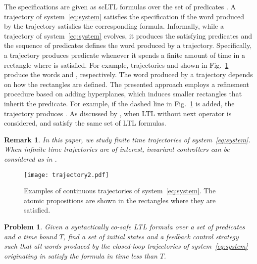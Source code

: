 \documentclass{ifacconf}
\newtheorem{remark}{Remark}
\newtheorem{problem}{Problem}
\newcommand{\TIMEBOUND}{\ensuremath{T}}
\begin{document}
The specifications are given as scLTL formulas over the set of predicates . A trajectory of system~\eqref{eq:system} satisfies the specification if the word produced by the trajectory satisfies the corresponding formula. 
Informally, while a trajectory of system~\eqref{eq:system} evolves, it produces the satisfying predicates and the sequence of predicates defines the word produced by a trajectory. Specifically, a trajectory produces predicate  whenever it spends a finite amount of time in a rectangle where  is satisfied. 
For example, trajectories  and  shown in Fig.~\ref{fig:trajectory} produce the words  and , respectively. 
The word produced by a trajectory depends on how the rectangles are defined. The presented approach employs a refinement procedure based on adding hyperplanes, which induces smaller rectangles that inherit the predicate.
For example, if the dashed line in Fig.~\ref{fig:trajectory} is added, the trajectory  produces .
As discussed by \cite{Kloetzer:2008}, when LTL without next operator is considered,    and  satisfy the same set of LTL formulas.
\begin{remark}
In this paper, we study finite time trajectories of system~\eqref{eq:system}. 
When infinite time trajectories are of interest, invariant controllers can be considered as in \cite{Habets2006}.
\end{remark}
  \begin{figure}
\centering
\texttt{[image: trajectory2.pdf]}
\caption{Examples of continuous trajectories of system~\eqref{eq:system}. The atomic propositions are shown in the rectangles where they are satisfied.}
\label{fig:trajectory}
\end{figure}



\begin{problem}\label{prob:main}
Given a syntactically co-safe LTL formula  over a set of predicates  and a time bound \TIMEBOUND,  find a set of initial states  
and a feedback control strategy such that all words produced by the closed-loop trajectories of system~\eqref{eq:system} originating in  satisfy the formula in time less than \TIMEBOUND.
\end{problem}
\end{document}
